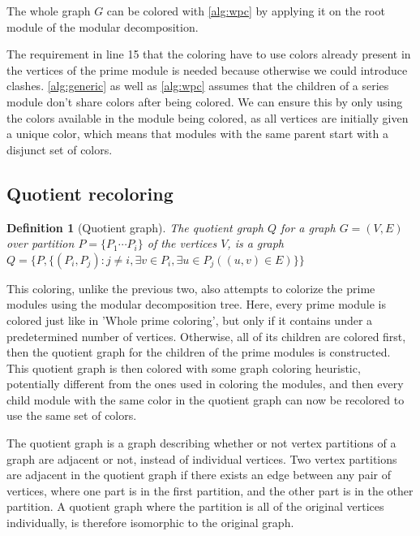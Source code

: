 \documentclass[a4paper]{article}
\newtheorem{definition}{Definition}[section]
\begin{document}
The whole graph $G$ can be colored with \autoref{alg:wpc} by applying it on the
root module of the modular decomposition.

The requirement in line 15 that the coloring have to use colors already present
in the vertices of the prime module is needed because otherwise we could
introduce clashes. \autoref{alg:generic} as well as \autoref{alg:wpc} assumes that the children of a series
module don't share colors after being colored. We can ensure this by only using the colors available
in the module being colored, as all vertices are initially given a unique color,
which means that modules with the same parent start with a disjunct set of
colors.

\subsection{Quotient recoloring}

\begin{definition}[Quotient graph]
    The quotient graph $Q$ for a graph $G = (V,E)$ over partition 
    $P = \{P_1 \cdots P_i\}$  of the vertices $V$, is a graph 
    $Q = \{P, \{(P_i,P_j) : j\neq i, \exists v \in P_i,\exists u \in P_j( (u,v)
    \in E)   \} \}  $
\end{definition}

This coloring, unlike the previous two, also attempts to colorize the prime
modules using the modular decomposition tree. Here, every prime module is
colored just like in 'Whole prime coloring', but only if it contains under a
predetermined number of vertices.  Otherwise, all of its children are colored
first, then the quotient graph for the children of the prime modules is
constructed. This quotient graph is then colored with some graph coloring
heuristic, potentially different from the ones used in coloring the modules,
and then every child module with the same color in the quotient graph can now
be recolored to use the same set of colors.

The quotient graph is a graph describing whether or not vertex partitions of a
graph are adjacent or not, instead of individual vertices. Two vertex
partitions are adjacent in the quotient graph if there exists an edge between
any pair of vertices, where one part is in the first partition, and the other
part is in the other partition. A quotient graph where the partition is all of
the original vertices individually, is therefore isomorphic to the original
graph.
\end{document}
